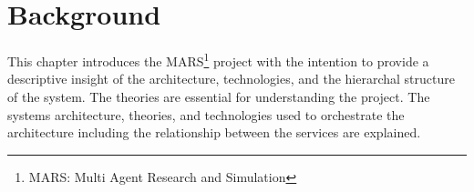 \newpage
\chapter{Background}
	
This chapter introduces the MARS\footnote{MARS: Multi Agent Research and Simulation} project with the intention to provide a descriptive insight
of the architecture, technologies, and the hierarchal structure of the system. The theories are essential for understanding the project. 
The systems architecture, theories, and technologies used to orchestrate the architecture including the 
relationship between the services are explained.

	
	
	
	